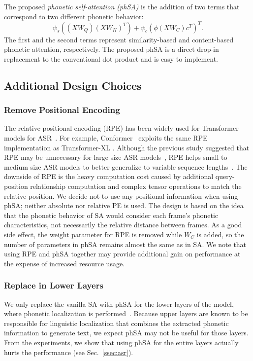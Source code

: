 The proposed \textit{phonetic self-attention (phSA)} is the addition of two terms that correspond to two different phonetic behavior:
\begin{equation}
    \psi_s((XW_Q)(XW_K)^T) + \psi_c(\phi(XW_C)c^T)^T.  \label{eq:phsa}
\end{equation}
The first and the second terms represent similarity-based and content-based phonetic attention, respectively.
The proposed phSA is a direct drop-in replacement to the conventional dot product and is easy to implement.

\subsection{Additional Design Choices}\label{ssec:design}

\subsubsection{Remove Positional Encoding}

The relative positional encoding (RPE) has been widely used for Transformer models for ASR~\cite{transformer-transducer, conformer, rpe-asr, cape}. For example, Conformer~\cite{conformer} exploits the same RPE implementation as Transformer-XL \cite{transformer-xl}.
Although the previous study suggested that RPE may be unnecessary for large size ASR models~\cite{pushing-semi}, RPE helps small to medium size ASR models to better generalize to variable sequence lengths~\cite{pe-jhpark}.
The downside of RPE is the heavy computation cost caused by additional query-position relationship computation and complex tensor operations to match the relative position.
We decide not to use any positional information when using phSA; neither absolute nor relative PE is used.
The design is based on the idea that the phonetic behavior of SA would consider each frame's phonetic characteristics, not necessarily the relative distance between frames.
As a good side effect, the weight parameter for RPE is removed while $W_C$ is added, so the number of parameters in phSA remains almost the same as in SA.
We note that using RPE and phSA together may provide additional gain on performance at the expense of increased resource usage.


\subsubsection{Replace in Lower Layers}

We only replace the vanilla SA with phSA for the lower layers of the model, where phonetic localization is performed~\cite{understanding}.
Because upper layers are known to be responsible for linguistic localization that combines the extracted phonetic information to generate text, we expect phSA may not be useful for those layers.
From the experiments, we show that using phSA for the entire layers actually hurts the performance (see Sec.~\ref{ssec:asr}).